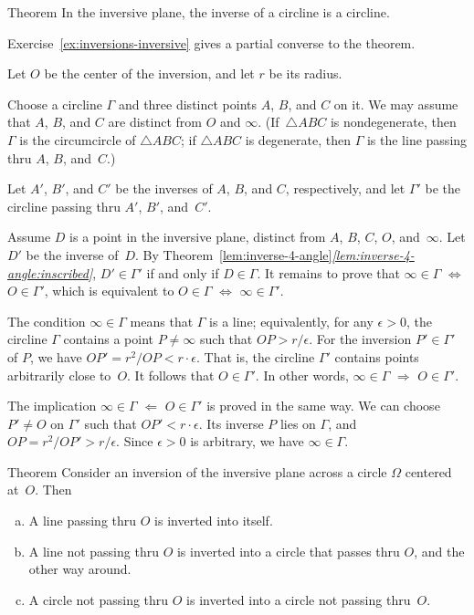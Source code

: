 \begin{thm}{Theorem}\label{thm:inverse-cline}
In the inversive plane, the inverse of a circline is a circline.
\end{thm}

Exercise~\ref{ex:inversions-inversive} gives a partial converse to the theorem.

Let $O$ be the center of the inversion, and let $r$ be its radius.

Choose a circline $\Gamma$ and three distinct points $A$, $B$, and $C$ on it.
We may assume that $A$, $B$, and $C$ are distinct from $O$ and $\infty$.
(If~$\triangle ABC$ is nondegenerate, then $\Gamma$ is the circumcircle of $\triangle ABC$; if $\triangle ABC$ is degenerate, then $\Gamma$ is the line passing thru $A$, $B$, and~$C$.)

Let $A'$, $B'$, and $C'$ be the inverses of $A$, $B$, and $C$, respectively,
and let $\Gamma'$ be the circline passing thru $A'$, $B'$, and~$C'$.

Assume $D$ is a point in the inversive plane, distinct from $A$, $B$, $C$, $O$, and~$\infty$.
Let $D'$ be the inverse of~$D$.
By Theorem~\ref{lem:inverse-4-angle}\textit{\ref{lem:inverse-4-angle:inscribed}},
$D' \in \Gamma'$ if and only if $D \in \Gamma$.
It remains to prove that
$\infty \in \Gamma$ $\Leftrightarrow$ $O \in \Gamma'$, which is equivalent to
$O \in \Gamma$ $\Leftrightarrow$ $\infty \in \Gamma'$.

The condition $\infty \in \Gamma$ means that $\Gamma$ is a line;
equivalently, for any $\epsilon > 0$, the circline $\Gamma$ contains a point $P \ne \infty$ such that $OP > r/\epsilon$.
For the inversion $P' \in \Gamma'$ of $P$, we have $OP' = r^2 / OP < r \cdot \epsilon$.
That is, the circline $\Gamma'$ contains points arbitrarily close to~$O$.
It follows that $O \in \Gamma'$.
In other words,
$\infty \in \Gamma$
$\Rightarrow$
$O \in \Gamma'$.

The implication
$\infty \in \Gamma$
$\Leftarrow$
$O \in \Gamma'$ is proved in the same way.
We can choose $P' \ne O$ on $\Gamma'$ such that $OP' < r \cdot \epsilon$.
Its inverse $P$ lies on $\Gamma$, and $OP = r^2 / OP' > r/\epsilon$.
Since $\epsilon>0$ is arbitrary, we have $\infty \in \Gamma$.
\qeds

\begin{thm}{Theorem}\label{thm:inverse}
Consider an inversion of the inversive plane across a circle $\Omega$ centered at~$O$. 
Then 
\begin{enumerate}[(a)]
\item\label{thm:inverse:line-line}
A line passing thru $O$ is inverted into itself.
\item\label{thm:inverse:line} 
A line not passing thru $O$ is inverted into a circle that passes thru $O$, and the other way around.
\item\label{thm:inverse:circle} 
A circle not passing thru $O$ 
is inverted into a circle not passing thru~$O$. 
\end{enumerate}
\end{thm}

